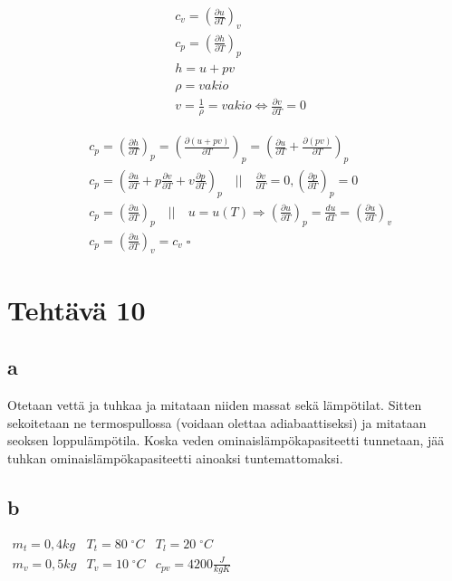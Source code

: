 \documentclass[12pt,a4paper,finnish]{article}
\begin{document}
\begin{align}
 &c_v = \left(\frac{\partial u}{\partial T}\right)_v\\
 &c_p = \left(\frac{\partial h}{\partial T}\right)_p\\
 &h = u + pv\\
 &\rho = vakio\\
 &v = \frac{1}{\rho} = vakio \Leftrightarrow \frac{\partial v}{\partial T} = 0
\end{align}

\begin{align}
 &c_p = \left(\frac{\partial h}{\partial T}\right)_p 
  = \left(\frac{\partial (u + pv)}{\partial T}\right)_p
   = \left(\frac{\partial u}{\partial T} + \frac{\partial (pv)}{\partial T}\right)_p\\
 &c_p
  = \left(\frac{\partial u}{\partial T} + p\frac{\partial v}{\partial T} 
    + v\frac{\partial p}{\partial T}\right)_p \quad\bigg|\bigg|\quad 
  \frac{\partial v}{\partial T} = 0, \left(\frac{\partial p}{\partial T}\right)_p = 0\\
 &c_p = \left(\frac{\partial u}{\partial T}\right)_p \quad\bigg|\bigg|\quad 
  u = u(T) \Rightarrow \left(\frac{\partial u}{\partial T}\right)_p 
     = \frac{du}{dT} = \left(\frac{\partial u}{\partial T}\right)_v\\
 &c_p = \left(\frac{\partial u}{\partial T}\right)_v = c_v \; \square
\end{align}

\section{Tehtävä 10}

\subsection{a}

Otetaan vettä ja tuhkaa ja mitataan niiden massat sekä lämpötilat. Sitten sekoitetaan ne termospullossa 
(voidaan olettaa adiabaattiseksi) ja mitataan seoksen loppulämpötila. Koska veden 
ominaislämpökapasiteetti tunnetaan, jää tuhkan ominaislämpökapasiteetti ainoaksi tuntemattomaksi.

\subsection{b}

\begin{math}
\begin{array}{lll}
  m_t = 0,4 kg & T_t = 80\;^{\circ}C & T_l = 20\;^{\circ}C\\
  m_v = 0,5 kg & T_v = 10\;^{\circ}C & c_{pv} = 4200 \frac{J}{kgK}\\
\end{array}
\end{math}
\end{document}
